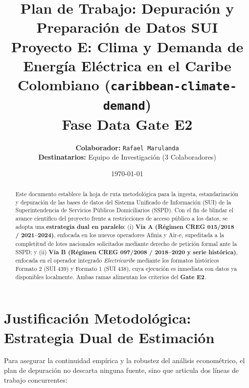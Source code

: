 \documentclass[11pt,a4paper]{article}
\title{\textbf{Plan de Trabajo: Depuración y Preparación de Datos SUI}\\
\large Proyecto E: Clima y Demanda de Energía Eléctrica en el Caribe Colombiano (\texttt{caribbean-climate-demand})\\
\large \textbf{Fase Data Gate E2}}
\author{\textbf{Colaborador:} \texttt{Rafael Marulanda}\\
\textbf{Destinatarios:} Equipo de Investigación (3 Colaboradores)}
\date{\today}
\begin{document}
\maketitle

\begin{abstract}
Este documento establece la hoja de ruta metodológica
para la ingesta, estandarización y depuración de las bases de datos 
del Sistema Unificado de Información (SUI) de la Superintendencia de 
Servicios Públicos Domiciliarios (SSPD). Con el fin de blindar el avance 
científico del proyecto frente a restricciones de acceso público a los datos, 
se adopta una \textbf{estrategia dual en paralelo}: (i) \textbf{Vía A (Régimen CREG 015/2018 / 2021--2024)}, 
enfocada en los nuevos operadores Afinia y Air-e, supeditada a la completitud de lotes nacionales 
solicitados mediante derecho de petición formal ante la SSPD; y (ii) \textbf{Vía B (Régimen CREG 097/2008 / 2018--2020 y serie histórica)}, 
enfocada en el operador integrado \textit{Electricaribe} mediante los formatos históricos 
Formato 2 (SUI 439) y Formato 1 (SUI 438), cuya ejecución es inmediata con datos ya disponibles localmente.
Ambas ramas alimentan los criterios del \textbf{Gate E2}.
\end{abstract}

\tableofcontents
\newpage

\section{Justificación Metodológica: Estrategia Dual de Estimación}

Para asegurar la continuidad empírica y la robustez del análisis econométrico, 
el plan de depuración no descarta ninguna fuente, sino que articula dos líneas de trabajo concurrentes:
\end{document}
